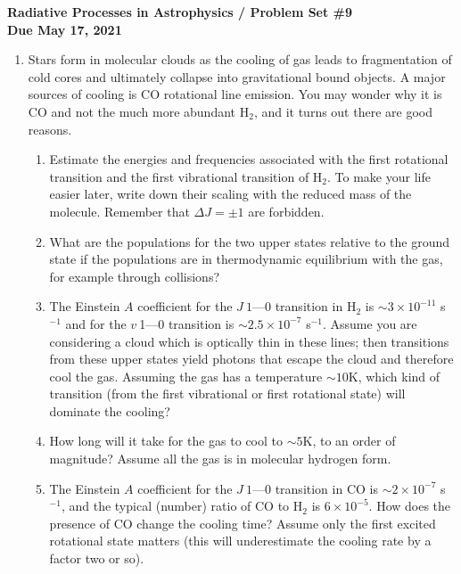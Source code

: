 \documentclass[11pt, preprint]{article}
\begin{document}
\begin{center}
  {\bf Radiative Processes in Astrophysics / Problem Set \#9 \\
    Due May 17, 2021}
\end{center}

\begin{enumerate}
\item Stars form in molecular clouds as the cooling of gas leads to
  fragmentation of cold cores and ultimately collapse into
  gravitational bound objects. A major sources of cooling is CO
  rotational line emission. You may wonder why it is CO and not the
  much more abundant H$_2$, and it turns out there are good reasons.

  \begin{enumerate}
    \item Estimate the energies and frequencies associated with the
      first rotational transition and the first vibrational transition
      of H$_2$. To make your life easier later, write down their
      scaling with the reduced mass of the molecule. Remember that
      $\Delta J=\pm 1$ are forbidden.
   \item What are the populations for the two upper states relative to
     the ground state if the populations are in thermodynamic
     equilibrium with the gas, for example through collisions?
   \item The Einstein $A$ coefficient for the $J~1$---$0$ transition
     in H$_2$ is $\sim 3\times 10^{-11}$ s$^{-1}$ and for the
     $v~$1---0 transition is $\sim 2.5\times 10^{-7}$ s$^{-1}$. Assume
     you are considering a cloud which is optically thin in these
     lines; then transitions from these upper states yield photons
     that escape the cloud and therefore cool the gas. Assuming the
     gas has a temperature $\sim 10$K, which kind of transition (from
     the first vibrational or first rotational state) will dominate
     the cooling?
   \item How long will it take for the gas to cool to $\sim 5$K, to an
     order of magnitude? Assume all the gas is in molecular hydrogen
     form.
   \item The Einstein $A$ coefficient for the $J~1$---$0$ transition in
     CO is $\sim 2\times 10^{-7}$ s$^{-1}$, and the typical (number)
     ratio of CO to H$_2$ is $6\times 10^{-5}$. How does the presence
     of CO change the cooling time? Assume only the first excited
     rotational state matters (this will underestimate the cooling
     rate by a factor two or so). 
  \end{enumerate}


\end{enumerate}
\end{document}

